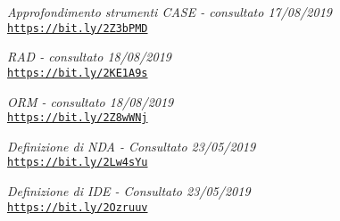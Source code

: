 \begin{thebibliography}{99}
	\bibitem{[12]} 
	\textit{Approfondimento strumenti CASE - consultato 17/08/2019}\\
	\texttt{\url{https://bit.ly/2Z3bPMD}}		


	\bibitem{[13]} 
	\textit{RAD - consultato 18/08/2019}\\
	\texttt{\url{https://bit.ly/2KE1A9s}}		
	
	
	\bibitem{[14]} 
	\textit{ORM - consultato 18/08/2019}\\
	\texttt{\url{https://bit.ly/2Z8wWNj}}		

	
	\bibitem{[15]}
	\textit{Definizione di NDA - Consultato 23/05/2019}\\
	\texttt{\url{https://bit.ly/2Lw4sYu}}
	
	\bibitem{[16]}
	\textit{Definizione di IDE - Consultato 23/05/2019}\\
	\texttt{\url{https://bit.ly/2Ozruuv}}
	
\end{thebibliography}



